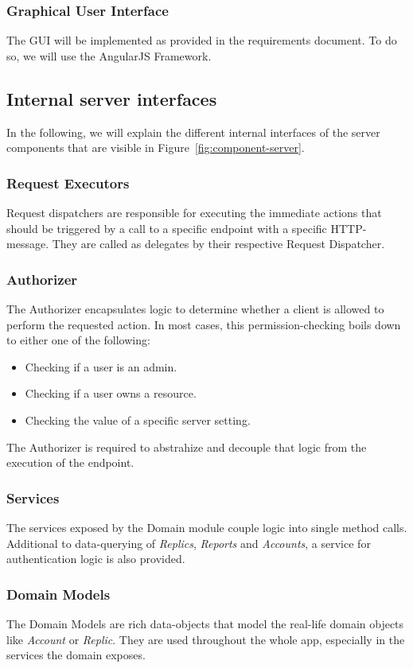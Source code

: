\subsubsection{Graphical User Interface}
The GUI will be implemented as provided in the requirements document.
To do so, we will use the AngularJS Framework.

\subsection{Internal server interfaces}\label{subsec:internal-server-interfaces}
In the following, we will explain the different internal interfaces of the server components that are visible in Figure~\ref{fig:component-server}.

\subsubsection{Request Executors}
Request dispatchers are responsible for executing the immediate actions that should be triggered by a call to a specific endpoint with a specific HTTP-message.
They are called as delegates by their respective Request Dispatcher.

\subsubsection{Authorizer}
The Authorizer encapsulates logic to determine whether a client is allowed to perform the requested action.
In most cases, this permission-checking boils down to either one of the following:
\begin{itemize}
    \item Checking if a user is an admin.
    \item Checking if a user owns a resource.
    \item Checking the value of a specific server setting.
\end{itemize}
The Authorizer is required to abstrahize and decouple that logic from the execution of the endpoint.

\subsubsection{Services}
The services exposed by the Domain module couple logic into single method calls.
Additional to data-querying of \textit{Replics}, \textit{Reports} and \textit{Accounts}, a service for authentication logic is also provided.

\subsubsection{Domain Models}
The Domain Models are rich data-objects that model the real-life domain objects like \textit{Account} or \textit{Replic}.
They are used throughout the whole app, especially in the services the domain exposes.

